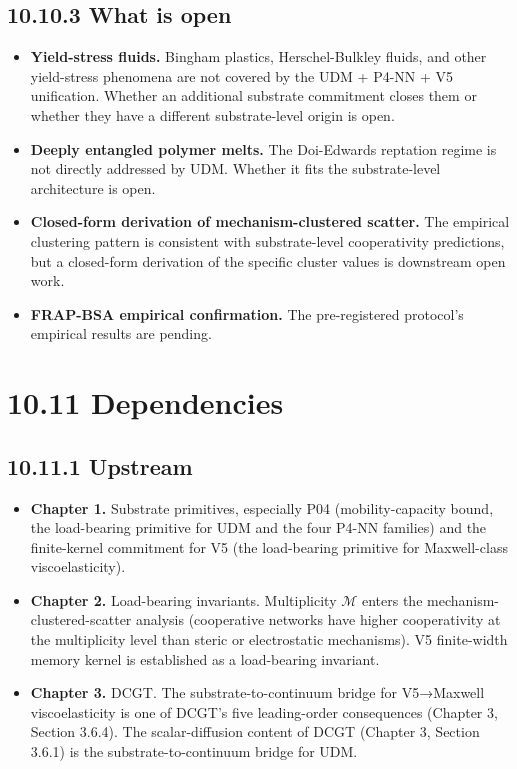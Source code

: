 \documentclass[11pt]{book}
\begin{document}
\subsection{10.10.3 What is open}

\begin{itemize}
\item \textbf{Yield-stress fluids.} Bingham plastics, Herschel-Bulkley fluids, and other yield-stress phenomena are not covered by the UDM + P4-NN + V5 unification. Whether an additional substrate commitment closes them or whether they have a different substrate-level origin is open.
\item \textbf{Deeply entangled polymer melts.} The Doi-Edwards reptation regime is not directly addressed by UDM. Whether it fits the substrate-level architecture is open.
\item \textbf{Closed-form derivation of mechanism-clustered scatter.} The empirical clustering pattern is consistent with substrate-level cooperativity predictions, but a closed-form derivation of the specific cluster values is downstream open work.
\item \textbf{FRAP-BSA empirical confirmation.} The pre-registered protocol's empirical results are pending.
\end{itemize}

\section{10.11 Dependencies}

\subsection{10.11.1 Upstream}

\begin{itemize}
\item \textbf{Chapter 1.} Substrate primitives, especially P04 (mobility-capacity bound, the load-bearing primitive for UDM and the four P4-NN families) and the finite-kernel commitment for V5 (the load-bearing primitive for Maxwell-class viscoelasticity).
\item \textbf{Chapter 2.} Load-bearing invariants. Multiplicity $\mathcal{M}$ enters the mechanism-clustered-scatter analysis (cooperative networks have higher cooperativity at the multiplicity level than steric or electrostatic mechanisms). V5 finite-width memory kernel is established as a load-bearing invariant.
\item \textbf{Chapter 3.} DCGT. The substrate-to-continuum bridge for V5→Maxwell viscoelasticity is one of DCGT's five leading-order consequences (Chapter 3, Section 3.6.4). The scalar-diffusion content of DCGT (Chapter 3, Section 3.6.1) is the substrate-to-continuum bridge for UDM.
\end{itemize}
\end{document}
